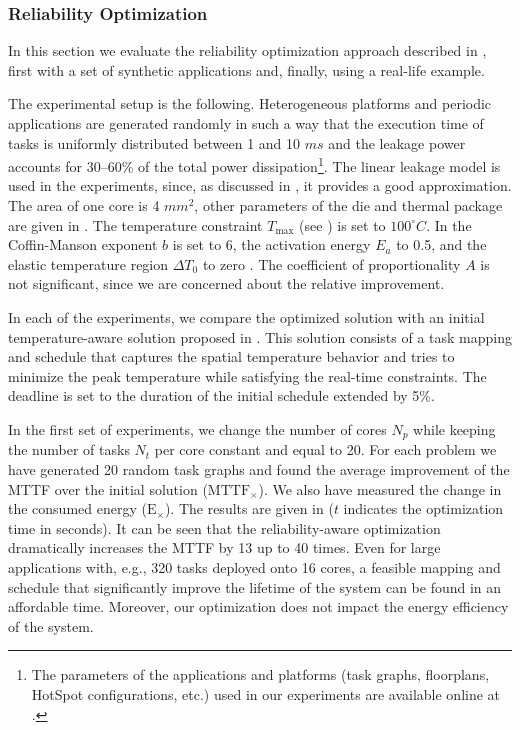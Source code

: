 \subsubsection{Reliability Optimization} 

In this section we evaluate the reliability optimization approach described in
, first with a set of synthetic applications and, finally,
using a real-life example.

The experimental setup is the following. Heterogeneous platforms and periodic
applications are generated randomly \cite{dick1998} in such a way that the
execution time of tasks is uniformly distributed between 1 and 10 $ms$ and the
leakage power accounts for 30--60\% of the total power dissipation\footnote{The
parameters of the applications and platforms (task graphs, floorplans, HotSpot
configurations, etc.) used in our experiments are available online at
\cite{liu2011}.}. The linear leakage model is used in the experiments, since, as
discussed in , it provides a good approximation. The
area of one core is 4 $mm^2$, other parameters of the die and thermal package
are given in . The temperature constraint $T_\text{max}$ (see
) is set to $100^\circ C$. In  the
Coffin-Manson exponent $b$ is set to 6, the activation energy $E_a$ to 0.5, and
the elastic temperature region $\Delta T_0$ to zero \cite{jedec2010}. The
coefficient of proportionality $A$ is not significant, since we are concerned
about the relative improvement.

In each of the experiments, we compare the optimized solution with an initial
temperature-aware solution proposed in \cite{xie2006}. This solution consists of
a task mapping and schedule that captures the spatial temperature behavior and
tries to minimize the peak temperature while satisfying the real-time
constraints. The deadline is set to the duration of the initial schedule
extended by 5\%.

In the first set of experiments, we change the number of cores $N_p$ while
keeping the number of tasks $N_t$ per core constant and equal to 20. For each
problem we have generated 20 random task graphs and found the average
improvement of the MTTF over the initial solution ($\scriptstyle
\text{MTTF}_\times$). We also have measured the change in the consumed energy
($\scriptstyle \text{E}_\times$). The results are given in 
($t$ indicates the optimization time in seconds). It can be seen that the
reliability-aware optimization dramatically increases the MTTF by 13 up to 40
times. Even for large applications with, e.g., 320 tasks deployed onto 16 cores,
a feasible mapping and schedule that significantly improve the lifetime of the
system can be found in an affordable time. Moreover, our optimization does not
impact the energy efficiency of the system.

